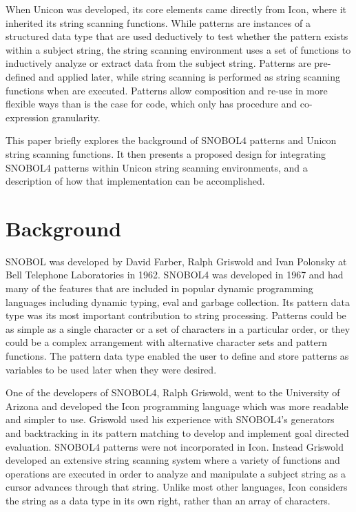 \documentclass{article}
\begin{document}
When Unicon was developed, its core elements came directly from Icon, where it inherited its string scanning functions.\cite{JefferyUnicon}  While patterns are instances of a structured data type that are used deductively to test whether the pattern exists within a subject string, the string scanning environment uses a set of functions to inductively analyze or extract data from the subject string.  Patterns are pre-defined and applied later, while string scanning is performed as string scanning functions when are executed.  Patterns allow composition and re-use in more flexible ways than is the case for code, which only has procedure and co-expression granularity.

This paper briefly explores the background of SNOBOL4 patterns and Unicon string scanning functions.  It then presents a proposed design for integrating SNOBOL4 patterns within Unicon string scanning environments, and a description of how that implementation can be accomplished. 

\section{Background}

SNOBOL was developed by David Farber, Ralph Griswold and Ivan Polonsky at Bell Telephone Laboratories in 1962.  SNOBOL4 was developed in 1967 and had many of the features that are included in popular dynamic programming languages including dynamic typing, eval and garbage collection.  Its pattern data type was its most important contribution to string processing.  Patterns could be as simple as a single character or a set of characters in a particular order, or they could be a complex arrangement with alternative character sets and pattern functions.  The pattern data type enabled the user to define and store patterns as variables to be used later when they were desired.\cite{Snobol}  

One of the developers of SNOBOL4, Ralph Griswold, went to the University of Arizona and developed the Icon programming language which was more readable and simpler to use.\cite{JefferyUnicon}  Griswold used his experience with SNOBOL4's generators and backtracking in its pattern matching to develop and implement goal directed evaluation.\cite{Gaikaiwari2005}  SNOBOL4 patterns were not incorporated in Icon.  Instead Griswold developed an extensive string scanning system where a variety of functions and operations are executed in order to analyze and manipulate a subject string as a cursor advances through that string.  Unlike most other languages, Icon considers the string as a data type in its own right, rather than an array of characters. \cite{GriswoldIcon}  
\end{document}

